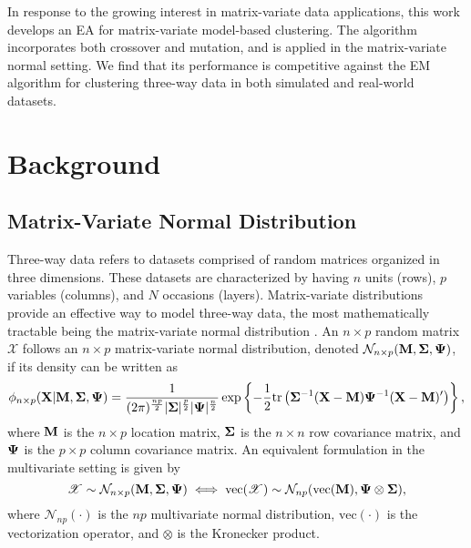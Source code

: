 \documentclass[12pt, centerh1]{article}
\begin{document}
In response to the growing interest in matrix-variate data applications, this work develops an EA for matrix-variate model-based clustering. The algorithm incorporates both crossover and mutation, and is applied in the matrix-variate normal setting. We find that its performance is competitive against the EM algorithm for clustering three-way data in both simulated and real-world datasets.   



\section{Background}
\subsection{Matrix-Variate Normal Distribution}
Three-way data refers to datasets comprised of random matrices organized in three dimensions. These datasets are characterized by having $n$ units (rows), $p$ variables (columns), and $N$ occasions (layers). Matrix-variate distributions provide an effective way to model three-way data, the most mathematically tractable being the matrix-variate normal distribution \citep{gupta1999}. An $n \times p$ random matrix $\mathscr{X}$ follows an $n \times p$ matrix-variate normal distribution, denoted $\mathcal{N}_{n\times p}({\bf M, \Sigma, \Psi})$, if its density can be written as
\begin{equation*}
\phi_{n\times p}({\bf X |  M, \Sigma, \Psi}) =  \frac{1}{(2\pi)^{\frac{np}{2}}|{\bf \Sigma}|^{\frac{p}{2}}|{\bf \Psi}|^{\frac{n}{2}}} \exp\left\{ -\frac{1}{2}\text{tr}\left({\bf \Sigma}^{-1}({\bf X} - {\bf M}) {\bf \Psi}^{-1}({\bf X} - {\bf M}) '\right)\right\},
\end{equation*}
where $\bf M$ is the $n \times p$ location matrix, $\bf \Sigma$ is the $n \times n$ row covariance matrix, and $\bf \Psi$ is the $p \times p$ column covariance matrix. An equivalent formulation in the multivariate setting is given by
\begin{equation*}
\mathscr{X} \sim \mathcal{N}_{n\times p}({\bf M, \Sigma, \Psi}) \iff \text{vec}(\mathscr{X}) \sim \mathcal{N}_{np}(\text{vec}({\bf M}), {\bf \Psi} \otimes {\bf \Sigma}),
\end{equation*}
where $\mathcal{N}_{np}(\cdot)$ is the $np$ multivariate normal distribution, $\text{vec}(\cdot)$ is the vectorization operator, and $\otimes$ is the Kronecker product. 
\end{document}
